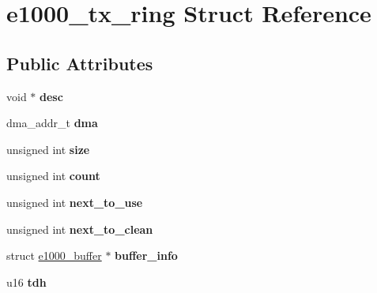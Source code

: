 \hypertarget{structe1000__tx__ring}{
\section{e1000\_\-tx\_\-ring Struct Reference}
\label{structe1000__tx__ring}
}
\subsection*{Public Attributes}
\begin{DoxyCompactItemize}
\item 
\hypertarget{structe1000__tx__ring_a06c7daacf1c22237c4d8ba0a4033de9a}{
void $\ast$ {\bfseries desc}}
\label{structe1000__tx__ring_a06c7daacf1c22237c4d8ba0a4033de9a}

\item 
\hypertarget{structe1000__tx__ring_a39df80f39714bbf5fad4521d8460caa5}{
dma\_\-addr\_\-t {\bfseries dma}}
\label{structe1000__tx__ring_a39df80f39714bbf5fad4521d8460caa5}

\item 
\hypertarget{structe1000__tx__ring_a028311f1513561ea0ae5fc4aa1e8d6f0}{
unsigned int {\bfseries size}}
\label{structe1000__tx__ring_a028311f1513561ea0ae5fc4aa1e8d6f0}

\item 
\hypertarget{structe1000__tx__ring_a291fffe8d5b6550510575602dc0276cc}{
unsigned int {\bfseries count}}
\label{structe1000__tx__ring_a291fffe8d5b6550510575602dc0276cc}

\item 
\hypertarget{structe1000__tx__ring_a01d204d02d7249e87872773b7fc34cd1}{
unsigned int {\bfseries next\_\-to\_\-use}}
\label{structe1000__tx__ring_a01d204d02d7249e87872773b7fc34cd1}

\item 
\hypertarget{structe1000__tx__ring_a2f5e0cd7794ac5f1bfc2fd04c673a057}{
unsigned int {\bfseries next\_\-to\_\-clean}}
\label{structe1000__tx__ring_a2f5e0cd7794ac5f1bfc2fd04c673a057}

\item 
\hypertarget{structe1000__tx__ring_a7e087bc398a1820192f7ba57aba5ae71}{
struct \hyperlink{structe1000__buffer}{e1000\_\-buffer} $\ast$ {\bfseries buffer\_\-info}}
\label{structe1000__tx__ring_a7e087bc398a1820192f7ba57aba5ae71}

\item 
\hypertarget{structe1000__tx__ring_a62113ab57a58633afe14594c43b5bd81}{
u16 {\bfseries tdh}}
\label{structe1000__tx__ring_a62113ab57a58633afe14594c43b5bd81}


\end{DoxyCompactItemize}
